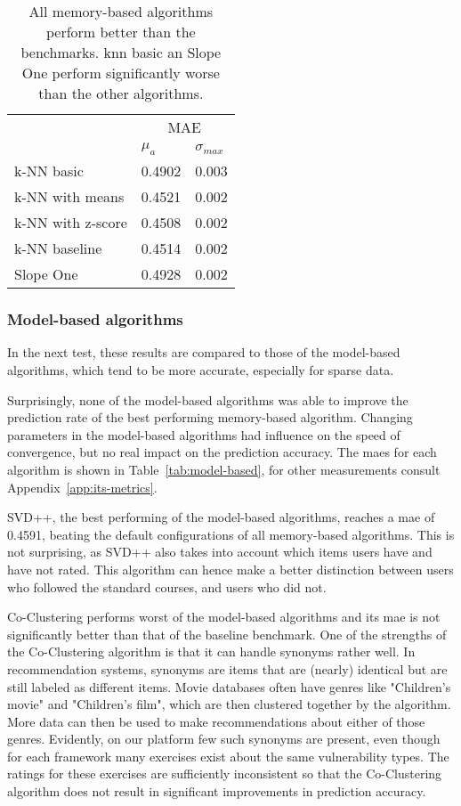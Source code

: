 \begin{table}
    \centering
    \caption[Prediction performance of memory-based algorithms]{All memory-based algorithms perform better than the benchmarks. \gls{knn} basic an Slope One perform significantly worse than the other algorithms.}
    \label{tab:memory-based}
    \small
    \begin{tabular}{l ll}
                 & \multicolumn{2}{c}{MAE}\\
    \cline{2-3} 
    & $\mu_a$ & $\sigma_{max}$\\
    \hline
k-NN basic        & 0.4902 & 0.003 \\ 
k-NN with means   & 0.4521 & 0.002 \\ 
k-NN with z-score & 0.4508 & 0.002 \\ 
k-NN baseline     & 0.4514 & 0.002 \\ 
Slope One         & 0.4928 & 0.002 \\
    \end{tabular}
\end{table}

\subsubsection{Model-based algorithms}
In the next test, these results are compared to those of the model-based algorithms, which tend to be more accurate, especially for sparse data.

Surprisingly, none of the model-based algorithms was able to improve the prediction rate of the best performing memory-based algorithm.
Changing parameters in the model-based algorithms had influence on the speed of convergence, but no real impact on the prediction accuracy.
The \glspl{mae} for each algorithm is shown in Table~\ref{tab:model-based}, for other measurements consult Appendix~\ref{app:its-metrics}.

SVD++, the best performing of the model-based algorithms, reaches a \gls{mae} of 0.4591, beating the default configurations of all memory-based algorithms.
This is not surprising, as SVD++ also takes into account which items users have and have not rated.
This algorithm can hence make a better distinction between users who followed the standard courses, and users who did not.

Co-Clustering performs worst of the model-based algorithms and its \gls{mae} is not significantly better than that of the baseline benchmark.
One of the strengths of the Co-Clustering algorithm is that it can handle synonyms rather well.
In recommendation systems, synonyms are items that are (nearly) identical but are still labeled as different items.
Movie databases often have genres like "Children's movie" and "Children's film", which are then clustered together by the algorithm.
More data can then be used to make recommendations about either of those genres.
Evidently, on our platform few such synonyms are present, even though for each framework many exercises exist about the same vulnerability types.
The ratings for these exercises are sufficiently inconsistent so that the Co-Clustering algorithm does not result in significant improvements in prediction accuracy.

